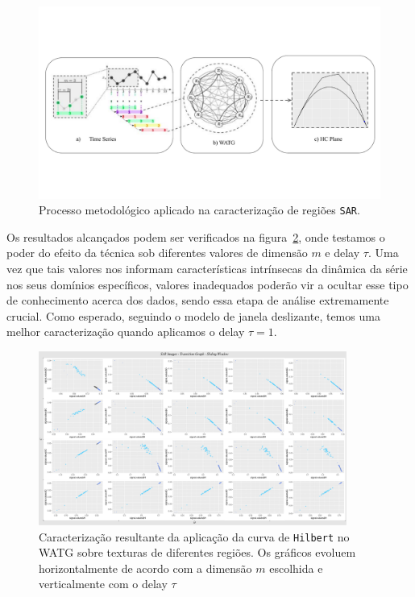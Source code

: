 \documentclass[12pt]{article}
\begin{document}
\begin{figure}[!h]
	\centering
	\vspace{-0.5cm}
	\includegraphics[scale = 0.6]{Figures/WATG.pdf}
	\vspace{-2.5cm}
    \caption{Processo metodológico aplicado na caracterização de regiões \texttt{SAR}.}
    \label{fig:WATG}
\end{figure}

Os resultados alcançados podem ser verificados na figura~\ref{fig:Regions}, onde testamos o poder do efeito da técnica sob diferentes valores de dimensão $m$ e delay $\tau$.
Uma vez que tais valores nos informam características intrínsecas da dinâmica da série nos seus domínios específicos, valores inadequados poderão vir a ocultar esse tipo de conhecimento acerca dos dados, sendo essa etapa de análise extremamente crucial. 
Como esperado, seguindo o modelo de janela deslizante, temos uma melhor caracterização quando aplicamos o delay $\tau = 1$.

\begin{figure}[!h]
	\centering
	\includegraphics[width=0.9\textwidth]{Figures/transitionGraphHilbert.png}
    \caption{Caracterização resultante da aplicação da curva de \texttt{Hilbert} no WATG sobre texturas de diferentes regiões. Os gráficos evoluem horizontalmente de acordo com a dimensão $m$ escolhida e verticalmente com o delay $\tau$}
    \label{fig:Regions}
\end{figure}
\end{document}

